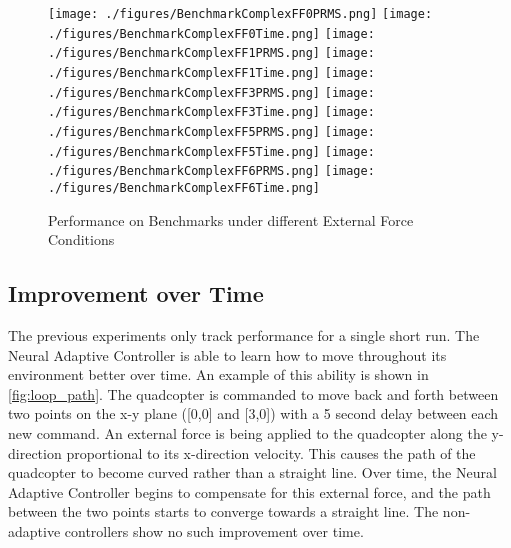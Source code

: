 \documentclass[letterpaper,12pt,titlepage,oneside,final]{book}
\begin{document}
\begin{figure}
\centering
\texttt{[image: ./figures/BenchmarkComplexFF0PRMS.png]}
\texttt{[image: ./figures/BenchmarkComplexFF0Time.png]}
\texttt{[image: ./figures/BenchmarkComplexFF1PRMS.png]}
\texttt{[image: ./figures/BenchmarkComplexFF1Time.png]}
\texttt{[image: ./figures/BenchmarkComplexFF3PRMS.png]}
\texttt{[image: ./figures/BenchmarkComplexFF3Time.png]}
\texttt{[image: ./figures/BenchmarkComplexFF5PRMS.png]}
\texttt{[image: ./figures/BenchmarkComplexFF5Time.png]}
\texttt{[image: ./figures/BenchmarkComplexFF6PRMS.png]}
\texttt{[image: ./figures/BenchmarkComplexFF6Time.png]}
\caption{Performance on Benchmarks under different External Force Conditions}
\label{fig:benchmark_complex}
\end{figure}


\subsection{Improvement over Time} %

The previous experiments only track performance for a single short run. 
The Neural Adaptive Controller is able to learn how to move throughout its environment better over time.
An example of this ability is shown in \autoref{fig:loop_path}.
The quadcopter is commanded to move back and forth between two points on the x-y plane ([0,0] and [3,0]) with a 5 second delay between each new command.
An external force is being applied to the quadcopter along the y-direction proportional to its x-direction velocity.
This causes the path of the quadcopter to become curved rather than a straight line.
Over time, the Neural Adaptive Controller begins to compensate for this external force, and the path between the two points starts to converge towards a straight line.
The non-adaptive controllers show no such improvement over time.
\end{document}
